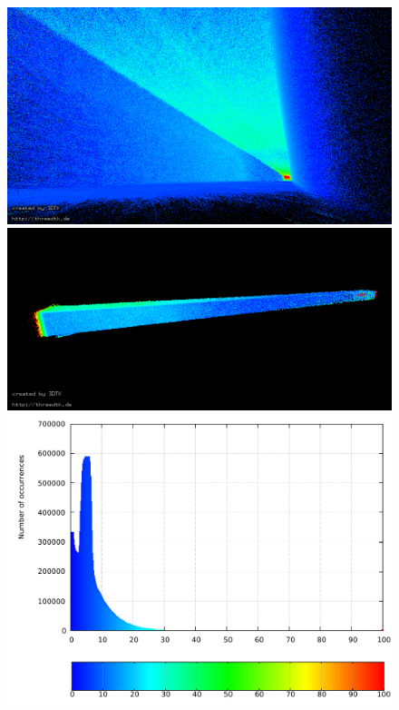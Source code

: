 \begin{figure}
\begin{minipage}[c]{0.495\textwidth}
  	\end{minipage}\hfill
  	\begin{minipage}[c]{0.495\textwidth}
  		\centering
		\includegraphics[width=\textwidth]{./images/corr_bottom_pose}\\
		\includegraphics[width=\textwidth]{./images/corr_side_view}\\
  		\includegraphics[width=\textwidth]{./images/corr_hist}

\end{minipage}
\end{figure}

